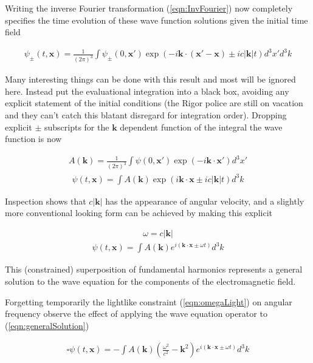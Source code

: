 \documentclass[]{eliblog}
\newcommand{\Abs}[1]{{\left\lvert{#1}\right\rvert}}
\newcommand{\Bk}[0]{\mathbf{k}}
\newcommand{\Bx}[0]{\mathbf{x}}
\newcommand{\delambertian}[0]{\square}
\newcommand{\inv}[1]{\frac{1}{#1}}
\begin{document}
Writing the inverse Fourier transformation (\ref{eqn:InvFourier}) now
completely specifies the time evolution of these wave function solutions given the initial time field

\begin{align}
{\psi}_{\pm}(t,\Bx) 
= \inv{({2\pi})^3} \int \psi_{\pm}(0,\Bx') \exp\left( -i \Bk \cdot (\Bx' -\Bx) \pm i c \Abs{\Bk} t \right) d^3 x' d^3 k
\end{align}

Many interesting things can be done with this result and most will be ignored here.  Instead put the evaluational integration into a black box, avoiding any explicit statement of the initial conditions (the Rigor police are still on vacation and they can't catch this blatant
disregard for integration order).  Dropping explicit $\pm$ subscripts for the $\Bk$ dependent function of the integral the wave 
function is now

\begin{align}
A(\Bk) = \inv{({2\pi})^3} \int \psi(0,\Bx') \exp\left( -i \Bk \cdot \Bx' \right) d^3 x'
\end{align}
\begin{align}\label{eqn:wavefunction}
{\psi}(t,\Bx) = \int A(\Bk) \exp\left( i \Bk \cdot \Bx \pm i c \Abs{\Bk} t \right) d^3 k
\end{align}

Inspection shows that $c \Abs{\Bk}$ has the appearance of angular velocity, and a slightly more 
conventional looking form can be achieved by making this explicit

\begin{align}\label{eqn:omegaLight}
\omega = c \Abs{\Bk}
\end{align}
\begin{align}\label{eqn:generalSolution}
{\psi}(t,\Bx) = \int A(\Bk) e^{ i (\Bk \cdot \Bx \pm \omega t) } d^3 k
\end{align}

This (constrained) superposition of fundamental harmonics represents a general solution to the wave equation for the components 
of the electromagnetic field.

Forgetting temporarily the lightlike constraint (\ref{eqn:omegaLight}) on angular frequency observe the effect of applying the wave equation operator to 
(\ref{eqn:generalSolution})

\begin{align}\label{eqn:matterWaveTemp}
\delambertian {\psi}(t,\Bx) = -\int A(\Bk) \left( \frac{\omega^2}{c^2} - \Bk^2 \right) e^{ i (\Bk \cdot \Bx \pm \omega t) } d^3 k
\end{align}
 
\end{document}
